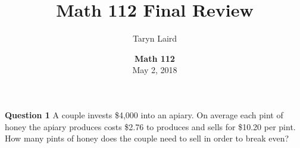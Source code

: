 \documentclass{beamer}
\begin{document}
\def\newblock{\hskip .11em plus .33em minus .07em}

\title[Math 112 Final Review]
{\textbf{Math 112 Final Review}}
\author[T.M.~Laird]{Taryn Laird}

\vspace{1em}

\date[UofA]{\textbf{Math 112}\\
May 2, 2018}

\frame{\titlepage}




%
%	
%
%
%	

\begin{frame}{\textbf{Question 1}}
	A couple invests \$4,000 into an apiary. On average each pint of honey the apiary produces costs \$2.76 to produces and sells for \$10.20 per pint. How many pints of honey does the couple need to sell in order to break even?
	\bigskip
	
%	
\end{frame}

%	
\end{document}
